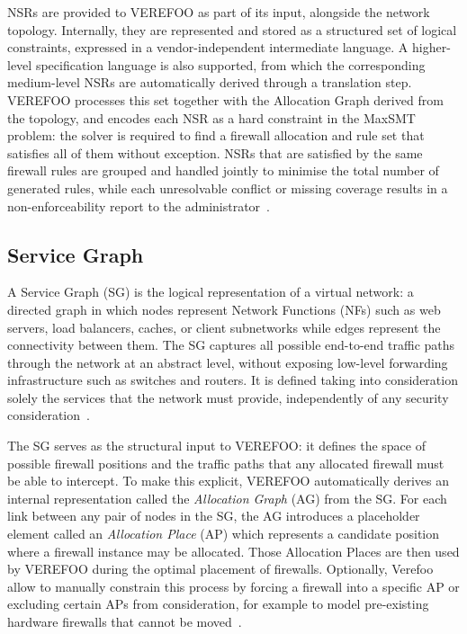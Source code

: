 NSRs are provided to VEREFOO as part of its input, alongside the network topology. Internally, they are represented and stored as a structured set of logical constraints, expressed in a vendor-independent intermediate language. A higher-level specification language is also supported, from which the corresponding medium-level NSRs are automatically derived through a translation step. VEREFOO processes this set together with the Allocation Graph derived from the topology, and encodes each NSR as a hard constraint in the MaxSMT problem: the solver is required to find a firewall allocation and rule set that satisfies all of them without exception. NSRs that are satisfied by the same firewall rules are grouped and handled jointly to minimise the total number of generated rules, while each unresolvable conflict or missing coverage results in a non-enforceability report to the administrator~\cite{verefoo,twofold}.

\subsection{Service Graph}

A Service Graph (SG) is the logical representation of a virtual network: a directed graph in which nodes represent Network Functions (NFs) such as web servers, load balancers, caches, or client subnetworks while edges represent the connectivity between them. The SG captures all possible end-to-end traffic paths through the network at an abstract level, without exposing low-level forwarding infrastructure such as switches and routers. It is defined taking into consideration solely the services that the network must provide, independently of any security consideration~\cite{verefoo}.

The SG serves as the structural input to VEREFOO: it defines the space of possible firewall positions and the traffic paths that any allocated firewall must be able to intercept. To make this explicit, VEREFOO automatically derives an internal representation called the \textit{Allocation Graph} (AG) from the SG. For each link between any pair of nodes in the SG, the AG introduces a placeholder element called an \textit{Allocation Place} (AP) which represents a candidate position where a firewall instance may be allocated. Those Allocation Places are then used by VEREFOO during the optimal placement of firewalls. Optionally, Verefoo allow to manually constrain this process by forcing a firewall into a specific AP or excluding certain APs from consideration, for example to model pre-existing hardware firewalls that cannot be moved~\cite{verefoo}.

